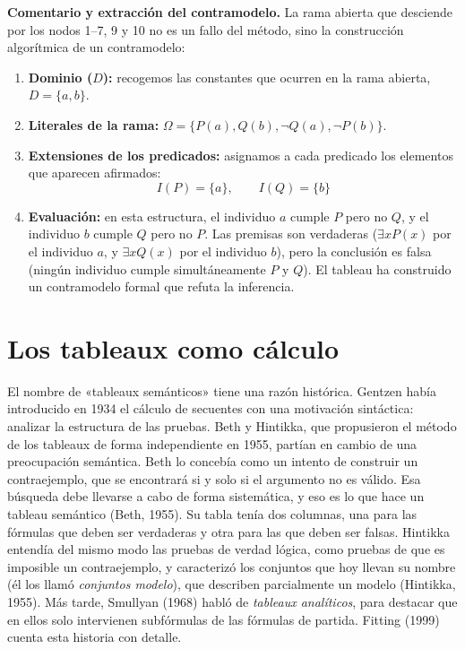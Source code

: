 \begin{ejemplo}
\textbf{Comentario y extracción del contramodelo.} 
La rama abierta que desciende por los nodos 1--7, 9 y 10 no es un fallo del método, sino la construcción algorítmica de un contramodelo:
\begin{enumerate}
    \item \textbf{Dominio ($D$):} recogemos las constantes que ocurren en la rama abierta, $D = \{a, b\}$.
    \item \textbf{Literales de la rama:} $\Omega = \{P(a), Q(b), \neg Q(a), \neg P(b)\}$.
    \item \textbf{Extensiones de los predicados:} asignamos a cada predicado los elementos que aparecen afirmados:
    \[
    I(P) = \{a\}, \qquad I(Q) = \{b\}
    \]
    \item \textbf{Evaluación:} en esta estructura, el individuo $a$ cumple $P$ pero no $Q$, y el individuo $b$ cumple $Q$ pero no $P$. Las premisas son verdaderas ($\exists x P(x)$ por el individuo $a$, y $\exists x Q(x)$ por el individuo $b$), pero la conclusión es falsa (ningún individuo cumple simultáneamente $P$ y $Q$). El tableau ha construido un contramodelo formal que refuta la inferencia.
\end{enumerate}
\end{ejemplo}

\section{Los tableaux como cálculo\ampliacion}\label{sec:tableaux-calculo}

El nombre de «tableaux semánticos» tiene una razón histórica. Gentzen
había introducido en 1934 el cálculo de secuentes con una motivación
sintáctica: analizar la estructura de las pruebas. Beth y Hintikka,
que propusieron el método de los tableaux de forma independiente en
1955, partían en cambio de una preocupación semántica. Beth lo
concebía como un intento de construir un contraejemplo,
que se encontrará si y solo si el argumento no es válido. Esa búsqueda
debe llevarse a cabo de forma sistemática, y eso es lo que hace un tableau semántico (Beth, 1955). Su tabla tenía dos columnas, una para las fórmulas que deben ser verdaderas y otra para las que deben ser falsas. Hintikka entendía del mismo modo las pruebas de verdad lógica, como pruebas de que es imposible un contraejemplo, y caracterizó los conjuntos que hoy llevan su nombre (él los llamó \emph{conjuntos modelo}), que describen parcialmente un modelo (Hintikka, 1955). Más tarde, Smullyan (1968) habló de \emph{tableaux analíticos}, para destacar que en ellos solo intervienen subfórmulas de las fórmulas de partida. Fitting (1999) cuenta esta historia con detalle.

